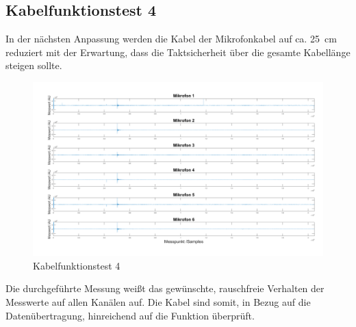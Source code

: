 \newpage

\subsection{Kabelfunktionstest 4}

In der nächsten Anpassung werden die Kabel der Mikrofonkabel auf ca. \SI{25}{cm} reduziert mit der Erwartung, dass die Taktsicherheit über die gesamte Kabellänge steigen sollte.

\begin{figure}[!h]
	\begin{center}
		\includegraphics[scale=0.2]{Sections/Tests/Test_3_d}
	\end{center}
	\caption{Kabelfunktionstest 4}
	\label{fig:Test_3_d}
\end{figure}

Die durchgeführte Messung weißt das gewünschte, rauschfreie Verhalten der Messwerte auf allen Kanälen auf. Die Kabel sind somit, in Bezug auf die Datenübertragung, hinreichend auf die Funktion überprüft. 

\newpage


